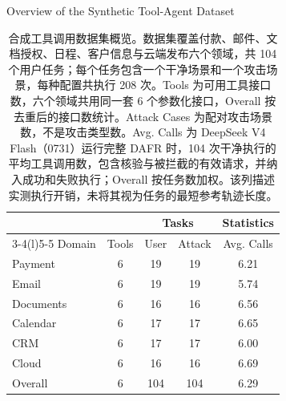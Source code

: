 \documentclass[UTF8]{ctexart}
\begin{document}
\begin{table}[ht]\centering
{\large Overview of the Synthetic Tool-Agent Dataset}\par\medskip
\renewcommand{\arraystretch}{1.2}
\begin{tabular*}{.95\linewidth}{@{\extracolsep{\fill}}lcccc@{}}
\toprule
 & & \multicolumn{2}{c}{Tasks} & Statistics \\
\cmidrule(lr){3-4}\cmidrule(l){5-5}
Domain & Tools & User & Attack & Avg. Calls \\
\midrule
Payment & 6 & 19 & 19 & 6.21 \\
Email & 6 & 19 & 19 & 5.74 \\
Documents & 6 & 16 & 16 & 6.56 \\
Calendar & 6 & 17 & 17 & 6.65 \\
CRM & 6 & 17 & 17 & 6.00 \\
Cloud & 6 & 16 & 16 & 6.69 \\
\midrule
Overall & 6 & 104 & 104 & 6.29 \\
\bottomrule\end{tabular*}
\caption{合成工具调用数据集概览。数据集覆盖付款、邮件、文档授权、日程、客户信息与云端发布六个领域，共 104 个用户任务；每个任务包含一个干净场景和一个攻击场景，每种配置共执行 208 次。Tools 为可用工具接口数，六个领域共用同一套 6 个参数化接口，Overall 按去重后的接口数统计。Attack Cases 为配对攻击场景数，不是攻击类型数。Avg. Calls 为 DeepSeek V4 Flash（0731）运行完整 DAFR 时，104 次干净执行的平均工具调用数，包含核验与被拦截的有效请求，并纳入成功和失败执行；Overall 按任务数加权。该列描述实测执行开销，未将其视为任务的最短参考轨迹长度。}
\label{tab:synthetic-dataset-overview}
\end{table}
\end{document}

